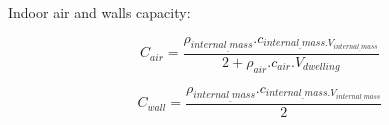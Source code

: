\documentclass[a4paper,10pt]{article}
\begin{document}
\begin{appendices}
Indoor air and walls capacity:

\begin{equation}
C_{air}=\frac{\rho_{internal_{\_}mass}.c_{internal_{\_}mass.V_{internal_{\_}mass}}}{2 + \rho_{air}.c_{air}.V_{dwelling}}
\end{equation}

\begin{equation}
C_{wall}=\frac{\rho_{internal_{\_}mass}.c_{internal_{\_}mass.V_{internal_{\_}mass}}}{2}
\end{equation}




  
\end{appendices}
\end{document}
